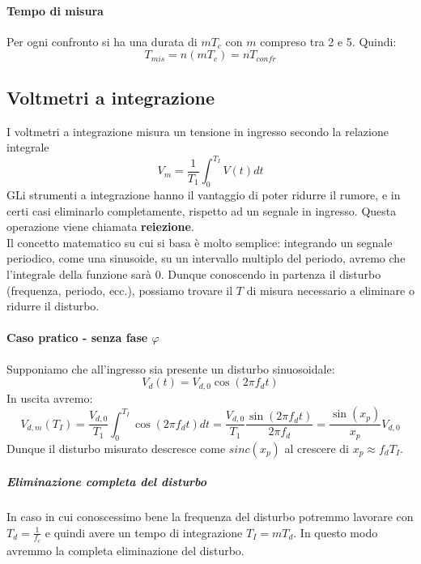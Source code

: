 \documentclass{article}
\begin{document}
	\paragraph*{Tempo di misura}
	Per ogni confronto si ha una durata di $mT_c$ con $m$ compreso tra 2 e 5. Quindi:
	\begin{equation}
		T_{mis} = n(mT_c) = nT_{confr}
	\end{equation}
	\subsection*{Voltmetri a integrazione}
	I voltmetri a integrazione misura un tensione in ingresso secondo la relazione integrale
	\begin{equation}
		V_m = \frac{1}{T_1} \int_{0}^{T_I} V(t) dt
	\end{equation}
	GLi strumenti a integrazione hanno il vantaggio di poter ridurre il rumore, e in certi casi eliminarlo completamente, rispetto ad un segnale in ingresso. Questa operazione viene chiamata \textbf{reiezione}.\\
	Il concetto matematico su cui si basa è molto semplice: integrando un segnale periodico, come una sinusoide, su un intervallo multiplo del periodo, avremo che l'integrale della funzione sarà 0.
	Dunque conoscendo in partenza il disturbo (frequenza, periodo, ecc.), possiamo trovare il $T$ di misura necessario a eliminare o ridurre il disturbo.
	\paragraph*{Caso pratico - senza fase $\varphi$}
	Supponiamo che all'ingresso sia presente un disturbo sinuosoidale:
	\begin{equation}
		V_d(t) = V_{d,0}\cos(2\pi f_d t)
	\end{equation}
	In uscita avremo:
	\begin{equation}
		V_{d,m}(T_I) = \frac{V_{d,0}}{T_1} \int_{0}^{T_I} \cos(2\pi f_d t) dt = \frac{V_{d,0}}{T_1} \frac{\sin(2\pi f_d t)}{2\pi f_d} = \frac{\sin(x_p)}{x_p} V_{d,0}
	\end{equation}
	Dunque il disturbo misurato descresce come $sinc(x_p)$ al crescere di $x_p \approx f_d T_I$.
	\subparagraph*{Eliminazione completa del disturbo}
	In caso in cui conoscessimo bene la frequenza del disturbo potremmo lavorare con $T_d = \frac{1}{f_c}$ e quindi avere un tempo di integrazione $T_I = mT_d$. In questo modo avremmo la completa eliminazione del disturbo.
\end{document}
